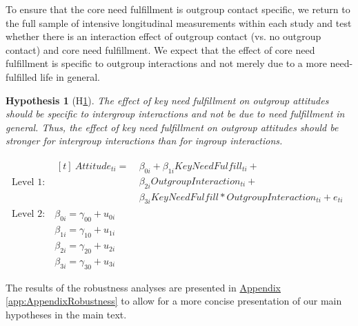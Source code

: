 \documentclass[man, 12pt, a4paper, mask]{apa7}
\theoremstyle{break}
\theoremstyle{plain}
\newtheorem{hyp}{Hypothesis}
\newcommand{\appref}[2][]{\hyperref[#2]{Appendix \ref*{#2}#1}}
\begin{document}
To ensure that the core need fulfillment is outgroup contact specific, we return to the full sample of intensive longitudinal measurements within each study and test whether there is an interaction effect of outgroup contact (vs. no outgroup contact) and core need fulfillment. We expect that the effect of core need fulfillment is specific to outgroup interactions and not merely due to a more need-fulfilled life in general.

\begin{mdframed}[style=mdfhypothesis]
    \begin{hyp}[H\ref{hyp:keyNeedContactType}] \label{hyp:keyNeedContactType}
    \addtolength{\leftskip}{1em}
    The effect of key need fulfillment on outgroup attitudes should be specific to intergroup interactions and not be due to need fulfillment in general. Thus, the effect of key need fulfillment on outgroup attitudes should be stronger for intergroup interactions than for ingroup interactions. 
    \end{hyp}

    \begin{fleqn}[\eqskip-\subhypskip]
      \begin{equation} \label{eq:SlopesAttCoreXContact}
        \begin{split}
          \textrm{Level 1:} &
            \begin{aligned}[t]
              \ Attitude_{ti} =  &\ \beta_{0i} + \beta_{1i}KeyNeedFulfill_{ti} + \\
                                 &\ \beta_{2i}OutgroupInteraction_{ti} + \\
                                 &\ \beta_{3i}KeyNeedFulfill*OutgroupInteraction_{ti} + e_{ti}
            \end{aligned} \\
          \textrm{Level 2:} &\ \beta_{0i} = \gamma_{00} + u_{0i} \\
                            &\ \beta_{1i} = \gamma_{10} + u_{1i} \\
                            &\ \beta_{2i} = \gamma_{20} + u_{2i} \\
                            &\ \beta_{3i} = \gamma_{30} + u_{3i}
        \end{split} 
      \end{equation}
    \end{fleqn}
\end{mdframed}
The results of the robustness analyses are presented in \appref{app:AppendixRobustness} to allow for a more concise presentation of our main hypotheses in the main text.
\end{document}
